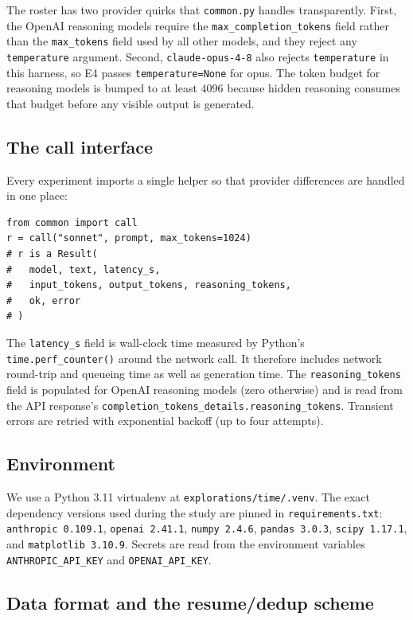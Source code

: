 \documentclass[11pt]{article}
\newcommand{\code}[1]{\texttt{\small #1}}
\begin{document}
The roster has two provider quirks that \code{common.py} handles transparently. First, the
OpenAI reasoning models require the \code{max\_completion\_tokens} field rather than the
\code{max\_tokens} field used by all other models, and they reject any \code{temperature}
argument. Second, \code{claude-opus-4-8} also rejects \code{temperature} in this harness, so
E4 passes \code{temperature=None} for opus. The token budget for reasoning models is bumped to
at least $4096$ because hidden reasoning consumes that budget before any visible output is
generated.

\subsection{The call interface}

Every experiment imports a single helper so that provider differences are handled in one place:

\begin{lstlisting}
from common import call
r = call("sonnet", prompt, max_tokens=1024)
# r is a Result(
#   model, text, latency_s,
#   input_tokens, output_tokens, reasoning_tokens,
#   ok, error
# )
\end{lstlisting}

The \code{latency\_s} field is wall-clock time measured by Python's \code{time.perf\_counter()}
around the network call. It therefore includes network round-trip and queueing time as well as
generation time. The \code{reasoning\_tokens} field is populated for OpenAI reasoning models
(zero otherwise) and is read from the API response's
\code{completion\_tokens\_details.reasoning\_tokens}. Transient errors are retried with
exponential backoff (up to four attempts).

\subsection{Environment}

We use a Python 3.11 virtualenv at \code{explorations/time/.venv}. The exact dependency
versions used during the study are pinned in \code{requirements.txt}: \code{anthropic 0.109.1},
\code{openai 2.41.1}, \code{numpy 2.4.6}, \code{pandas 3.0.3}, \code{scipy 1.17.1}, and
\code{matplotlib 3.10.9}. Secrets are read from the environment variables
\code{ANTHROPIC\_API\_KEY} and \code{OPENAI\_API\_KEY}.

\subsection{Data format and the resume/dedup scheme}
\end{document}
